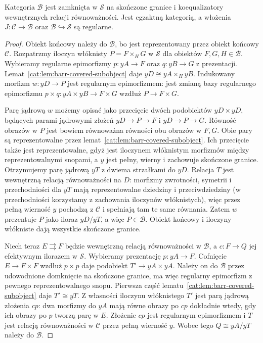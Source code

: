 \begin{stwierdzenie}\label{cat:prop:barr-completion-closure}
Kategoria $\mathcal B$ jest zamknięta w $\mathcal S$ na skończone granice i koequalizatory wewnętrznych relacji równoważności. Jest egzaktną kategorią, a włożenia $J:\mathcal C\to\mathcal B$ oraz $\mathcal B\hookrightarrow\mathcal S$ są regularne.
\end{stwierdzenie}
\begin{proof}
Obiekt końcowy należy do $\mathcal B$, bo jest reprezentowany przez obiekt końcowy $\mathcal C$. Rozpatrzmy iloczyn włóknisty $P=F\times_H G$ w $\mathcal S$ dla obiektów $F,G,H\in\mathcal B$. Wybieramy regularne epimorfizmy $p:yA\to F$ oraz $q:yB\to G$ z prezentacji. Lemat~\ref{cat:lem:barr-covered-subobject} daje $yD\cong yA\times_H yB$. Indukowany morfizm $w:yD\to P$ jest regularnym epimorfizmem: jest zmianą bazy regularnego epimorfizmu $p\times q:yA\times yB\to F\times G$ wzdłuż $P\to F\times G$.

Parę jądrową $w$ możemy opisać jako przecięcie dwóch podobiektów $yD\times yD$, będących parami jądrowymi złożeń $yD\to P\to F$ i $yD\to P\to G$. Równość obrazów w $P$ jest bowiem równoważna równości obu obrazów w $F,G$. Obie pary są reprezentowalne przez lemat~\ref{cat:lem:barr-covered-subobject}. Ich przecięcie także jest reprezentowalne, gdyż jest iloczynem włóknistym morfizmów między reprezentowalnymi snopami, a $y$ jest pełny, wierny i zachowuje skończone granice. Otrzymujemy parę jądrową $yT$ z dwiema strzałkami do $yD$. Relacja $T$ jest wewnętrzną relacją równoważności na $D$: morfizmy zwrotności, symetrii i przechodniości dla $yT$ mają reprezentowalne dziedziny i przeciwdziedziny (w przechodniości korzystamy z zachowania iloczynów włóknistych), więc przez pełną wierność $y$ pochodzą z $\mathcal C$ i spełniają tam te same równania. Zatem $w$ prezentuje $P$ jako iloraz $yD/yT$, a więc $P\in\mathcal B$. Obiekt końcowy i iloczyny włókniste dają wszystkie skończone granice.

Niech teraz $E\rightrightarrows F$ będzie wewnętrzną relacją równoważności w $\mathcal B$, a $c:F\to Q$ jej efektywnym ilorazem w $\mathcal S$. Wybieramy prezentację $p:yA\to F$. Cofnięcie $E\to F\times F$ wzdłuż $p\times p$ daje podobiekt $T'\to yA\times yA$. Należy on do $\mathcal B$ przez udowodnione domknięcie na skończone granice, ma więc regularny epimorfizm z pewnego reprezentowalnego snopu. Pierwsza część lematu~\ref{cat:lem:barr-covered-subobject} daje $T'\cong yT$. Z własności iloczynu włóknistego $T'$ jest parą jądrową złożenia $cp$: dwa morfizmy do $yA$ mają równe obrazy po $cp$ dokładnie wtedy, gdy ich obrazy po $p$ tworzą parę w $E$. Złożenie $cp$ jest regularnym epimorfizmem i $T$ jest relacją równoważności w $\mathcal C$ przez pełną wierność $y$. Wobec tego $Q\cong yA/yT$ należy do $\mathcal B$.


\end{proof}
